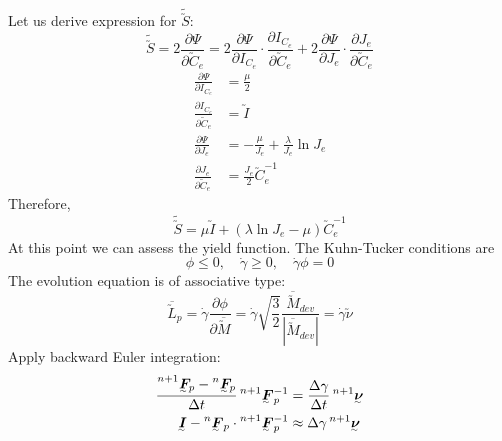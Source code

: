 Let us derive expression for \(\widetilde{\utilde{S}}\):
\begin{equation}
  \label{eq:PK2intDeriv}
  \widetilde{\utilde{S}} = 2 \frac{\partial \Psi}{\partial \utilde{C}_{e}} = 
  2 \frac{\partial \Psi}{\partial I_{C_{e}}} \cdot
  \frac{\partial I_{C_{e}}}{\partial \utilde{C}_{e}} +
  2 \frac{\partial \Psi}{\partial J_{e}} \cdot
  \frac{\partial J_{e}}{\partial \utilde{C}_{e}}
\end{equation}
\begin{align}
  \frac{\partial \Psi}{\partial I_{C_{e}}} &= \frac{\mu}{2} \\
  \frac{\partial I_{C_{e}}}{\partial \utilde{C}_{e}} &= \utilde{I} \\
  \frac{\partial \Psi}{\partial J_{e}} &= - \frac{\mu}{J_{e}} + 
                                         \frac{\lambda}{J_{e}} \ln J_{e} \\
  \frac{\partial J_{e}}{\partial \utilde{C}_{e}} &= \frac{J_{e}}{2} \utilde{C}_{e}^{-1}
\end{align}
Therefore,
\begin{equation}
  \label{eq:PK2intFinal}
  \widetilde{\utilde{S}} = \mu \utilde{I} + \left( \lambda \ln J_{e} -
    \mu \right) \utilde{C}_{e}^{-1}
\end{equation}
At this point we can assess the yield function. 
The Kuhn-Tucker conditions are
\begin{equation}
  \label{eq:kuhn-tucker}
  \phi \leq 0, \quad \dot{\gamma} \geq 0, \quad \dot{\gamma} \phi = 0 
\end{equation}
The evolution equation is of associative type:
\begin{equation}
  \label{eq:evolution}
  \overline{\utilde{L}}_{p} = \dot{\gamma}
  \frac{\partial \phi}{\partial \overline{\utilde{M}}} = 
  \dot{\gamma} \sqrt{\frac{3}{2}} 
  \frac{\overline{\utilde{M}}_{dev}}{\left| \overline{\utilde{M}}_{dev} \right|} =
  \dot{\gamma} \utilde{\nu}
\end{equation}
Apply backward Euler integration:
\begin{align}
  \frac{\prescript{n+1}{}{\utilde{F}_{p} -\prescript{n}{}{\utilde{F}_{p}}}}{\Delta t}
  \prescript{n+1}{}{\utilde{F}}_{p}^{-1} &= \frac{\Delta \gamma}{\Delta t} 
                                           \prescript{n+1}{}{\utilde{\nu}} \\
  \utilde{I} - \prescript{n}{}{\utilde{F}}_{p} \cdot
  \prescript{n+1}{}{\utilde{F}}_{p}^{-1} &\approx
  \Delta \gamma \prescript{n+1}{}{\utilde{\nu}}
\end{align}
